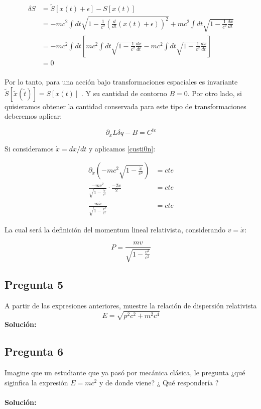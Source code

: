 \documentclass[../main_ej.tex]{subfiles}
\begin{document}
\begin{align}
    \delta S &= \tilde{S}[x(t) + \epsilon] - S[x(t)] \\
    &= -mc^2 \int dt \sqrt{1 - \frac{1}{c^2}\left( \frac{d}{dt}(x(t)+\epsilon) \right)^2} + mc^2 \int dt \sqrt{1 - \frac{1}{c^2}\frac{dx}{dt}}  \\
    &= -mc^2 \int dt \left[ mc^2 \int dt \sqrt{1 - \frac{1}{c^2}\frac{dx}{dt}} - mc^2 \int dt \sqrt{1 - \frac{1}{c^2}\frac{dx}{dt}} \right]\\
    &= 0\\
\end{align}

Por lo tanto, para una acción bajo transformaciones espaciales es invariante $\tilde{S}[\tilde{x}(\tilde{t})] = S[x(t)]$ . Y su cantidad de contorno $B=0$. Por otro lado, si quisieramos obtener la cantidad conservada para este tipo de transformaciones deberemos aplicar: 

\begin{equation}
    \partial_{\dot{x}}L \delta q - B = C^{te} \label{custi0n}
\end{equation}

Si consideramos $\dot{x}= dx/dt$ y aplicamos \eqref{custi0n}: 

\begin{align}
    \partial_{\dot{x}}\left( -mc^2\sqrt{1 - \frac{\dot{x}}{c^2}} \right) &= cte\\
    \frac{-mc^2}{\sqrt{1 - \frac{\dot{x}}{c^2}}} \cdot \frac{-2 \dot{x}}{2} &= cte \\
    \frac{m\dot{x}}{\sqrt{1 - \frac{x^2}{c^2}}} &= cte
\end{align}

La cual será la definición del momentum lineal relativista, considerando $v = \dot{x}$: 

\begin{equation}
    P=\frac{mv}{\sqrt{1-\frac{v^2}{c^2}}}
\end{equation}

\subsection{Pregunta 5}
A partir de las expresiones anteriores, muestre la relación de dispersión relativista
\begin{equation}
  E=\sqrt{p^2c^2+m^2c^4}
\end{equation}
\textbf{Solución:}
\\
\subsection{Pregunta 6}
Imagine que un estudiante que ya pasó por mecánica clásica, le pregunta ¿qué siginfica la expresión $E=mc^2$ y de donde viene? ¿ Qué respondería ?  \\
\\
\textbf{Solución:}
\\
\end{document}
